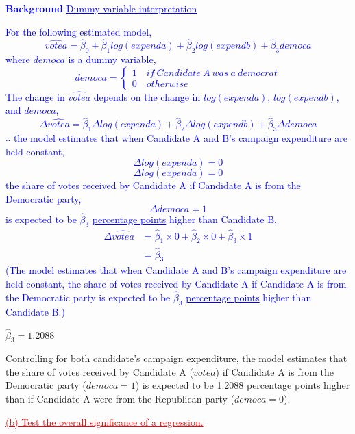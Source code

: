 \documentclass[12pt]{report}
\newenvironment{blueframed}[1][blue]
{\def\FrameCommand{\fboxsep=\FrameSep\fcolorbox{#1}{white}}%
	\MakeFramed {\advance\hsize-\width \FrameRestore}}
{\endMakeFramed}
\begin{document}
\newpage
\justify
\begin{blueframed}
	\textcolor{blue}{\textbf{Background}}
	\vspace{-\baselineskip}
	\justify
	\textcolor{blue}{\underline{Dummy variable interpretation}}
	
	\noindent \textcolor{blue} 
	{
		For the following estimated model, $$\widehat{votea} = \hat{\beta}_0 + \hat{\beta}_1log(expenda) + \hat{\beta}_2log(expendb) + \hat{\beta}_3democa$$ where $democa$ is a dummy variable, $$democa = \begin{cases}
		1 \quad if\ Candidate\ A\ was\ a\ democrat \\
		0 \quad otherwise
		\end{cases}$$ The change in $\widehat{votea}$ depends on the change in $log(expenda)$, $log(expendb)$, and $democa$, $$\Delta \widehat{votea} = \hat{\beta}_1\Delta log(expenda) + \hat{\beta}_2\Delta log(expendb) + \hat{\beta}_3\Delta democa$$ $\therefore$ the model estimates that when Candidate A and B's campaign expenditure are held constant, $$\Delta log(expenda) = 0$$ $$\Delta log(expenda) = 0$$ the share of votes received by Candidate A if Candidate A is from the Democratic party, $$\Delta democa = 1$$ is expected to be $\hat{\beta}_3$ \uline{percentage points} higher than Candidate B, \begin{align*}
		\Delta \widehat{votea} &= \hat{\beta}_1\times 0 + \hat{\beta}_2\times 0 + \hat{\beta}_3\times 1 \\
		&= \hat{\beta}_3
		\end{align*} (The model estimates that when Candidate A and B's campaign expenditure are held constant, the share of votes received by Candidate A if Candidate A is from the Democratic party is expected to be $\hat{\beta}_3$ \uline{percentage points} higher than Candidate B.)
	}
\end{blueframed}

\noindent $\hat{\beta}_3 = 1.2088$

\noindent Controlling for both candidate's campaign expenditure, the model estimates that the share of votes received by Candidate A ($votea$) if Candidate A is from the Democratic party ($democa = 1$) is expected to be 1.2088 \uline{percentage points} higher than if Candidate A were from the Republican party ($democa=0$).

\newpage
\noindent \textcolor{red}
{
	\uline{(b) Test the overall significance of a regression.}
}
\end{document}
